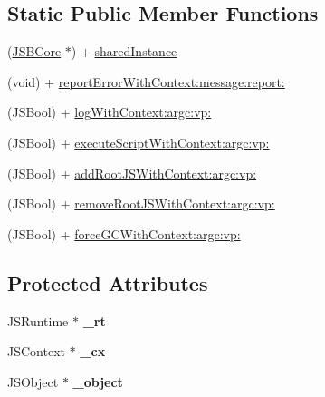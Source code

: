 \subsection*{Static Public Member Functions}
\begin{DoxyCompactItemize}
\item 
(\hyperlink{interface_j_s_b_core}{J\-S\-B\-Core} $\ast$) + \hyperlink{interface_j_s_b_core_a2cb2b4e530c120ad846a15ca6777a1a8}{shared\-Instance}
\item 
(void) + \hyperlink{interface_j_s_b_core_ad5ff7903db0393fac9876cca4358e6de}{report\-Error\-With\-Context\-:message\-:report\-:}
\item 
(J\-S\-Bool) + \hyperlink{interface_j_s_b_core_aaa7792cbf8a2b6b810e9c96cc6c57b87}{log\-With\-Context\-:argc\-:vp\-:}
\item 
(J\-S\-Bool) + \hyperlink{interface_j_s_b_core_a7242dacac8378050a58bd5b29647975f}{execute\-Script\-With\-Context\-:argc\-:vp\-:}
\item 
(J\-S\-Bool) + \hyperlink{interface_j_s_b_core_ac0a30ab3d415806ab0936648c775be00}{add\-Root\-J\-S\-With\-Context\-:argc\-:vp\-:}
\item 
(J\-S\-Bool) + \hyperlink{interface_j_s_b_core_a52c79f9b9a0c4b01c88ac42f276ac4b0}{remove\-Root\-J\-S\-With\-Context\-:argc\-:vp\-:}
\item 
(J\-S\-Bool) + \hyperlink{interface_j_s_b_core_ad242f84d423ac8176405d6d24b059728}{force\-G\-C\-With\-Context\-:argc\-:vp\-:}
\end{DoxyCompactItemize}
\subsection*{Protected Attributes}
\begin{DoxyCompactItemize}
\item 
\hypertarget{interface_j_s_b_core_a3db80a5a798a3a42365c2dde37a47ce6}{J\-S\-Runtime $\ast$ {\bfseries \-\_\-rt}}\label{interface_j_s_b_core_a3db80a5a798a3a42365c2dde37a47ce6}

\item 
\hypertarget{interface_j_s_b_core_ace54e2d2ceca135638d637e2c5df6b56}{J\-S\-Context $\ast$ {\bfseries \-\_\-cx}}\label{interface_j_s_b_core_ace54e2d2ceca135638d637e2c5df6b56}

\item 
\hypertarget{interface_j_s_b_core_a6b05b24e276d82c03f70ea798da6e465}{J\-S\-Object $\ast$ {\bfseries \-\_\-object}}\label{interface_j_s_b_core_a6b05b24e276d82c03f70ea798da6e465}

\end{DoxyCompactItemize}
